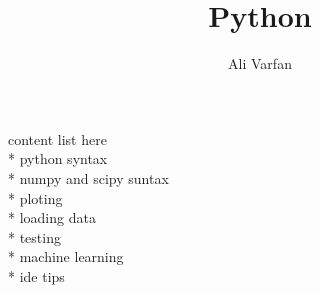 \documentclass{article}
\title{Python}
\author{Ali Varfan}
\begin{document}
\maketitle
content list here \\*
python syntax \\*
numpy and scipy suntax \\*
ploting \\*
loading data \\*
testing\\*
machine learning \\*
ide tips
\end{document}
